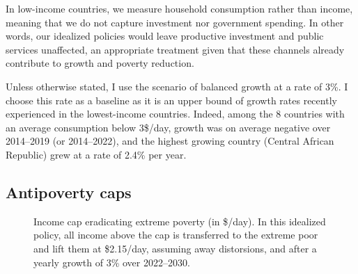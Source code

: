 In low-income countries, we measure household consumption rather than income, meaning that we do not capture investment nor government spending. In other words, our idealized policies would leave productive investment and public services unaffected, an appropriate treatment given that these channels already contribute to growth and poverty reduction.%

Unless otherwise stated, I use the scenario of balanced growth at a rate of 3\%. I choose this rate as a baseline as it is an upper bound of growth rates recently experienced in the lowest-income countries. Indeed, among the 8 countries with an average consumption below 3\$/day, growth was on average negative over 2014--2019 (or 2014--2022), and the highest growing country (Central African Republic) grew at a rate of 2.4\% per year. %

\subsection{Antipoverty caps}

\begin{figure}[!b]
  \caption[Anti-extreme-poverty cap in 2030 after 3\% growth.]{Income cap eradicating extreme poverty (in \$/day). In this idealized policy, all income above the cap is transferred to the extreme poor and lift them at \$2.15/day, assuming away distorsions, and after a yearly growth of 3\% over 2022--2030. %
  }\label{fig:antipoverty_cap}
\end{figure} 


